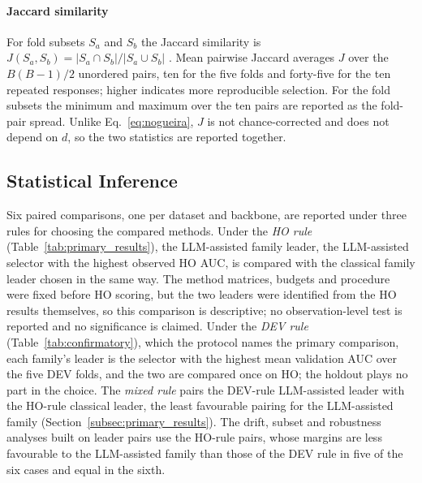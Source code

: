 \documentclass[final,5p,twocolumn]{elsarticle}
\begin{document}
\paragraph{Jaccard similarity}
For fold subsets $S_a$ and $S_b$ the Jaccard similarity is $J(S_a,S_b)=|S_a\cap S_b|/|S_a\cup S_b|$ \cite{jaccard1901}. Mean pairwise Jaccard averages $J$ over the $B(B-1)/2$ unordered pairs, ten for the five folds and forty-five for the ten repeated responses; higher indicates more reproducible selection. For the fold subsets the minimum and maximum over the ten pairs are reported as the fold-pair spread. Unlike Eq.~\eqref{eq:nogueira}, $J$ is not chance-corrected and does not depend on $d$, so the two statistics are reported together.

\subsection{Statistical Inference}
\label{subsec:inference}

Six paired comparisons, one per dataset and backbone, are reported under three rules for choosing the compared methods. Under the \emph{HO rule} (Table~\ref{tab:primary_results}), the LLM-assisted family leader, the LLM-assisted selector with the highest observed HO AUC, is compared with the classical family leader chosen in the same way. The method matrices, budgets and procedure were fixed before HO scoring, but the two leaders were identified from the HO results themselves, so this comparison is descriptive; no observation-level test is reported and no significance is claimed. Under the \emph{DEV rule} (Table~\ref{tab:confirmatory}), which the protocol names the primary comparison, each family's leader is the selector with the highest mean validation AUC over the five DEV folds, and the two are compared once on HO; the holdout plays no part in the choice. The \emph{mixed rule} pairs the DEV-rule LLM-assisted leader with the HO-rule classical leader, the least favourable pairing for the LLM-assisted family (Section~\ref{subsec:primary_results}). The drift, subset and robustness analyses built on leader pairs use the HO-rule pairs, whose margins are less favourable to the LLM-assisted family than those of the DEV rule in five of the six cases and equal in the sixth.
\end{document}
